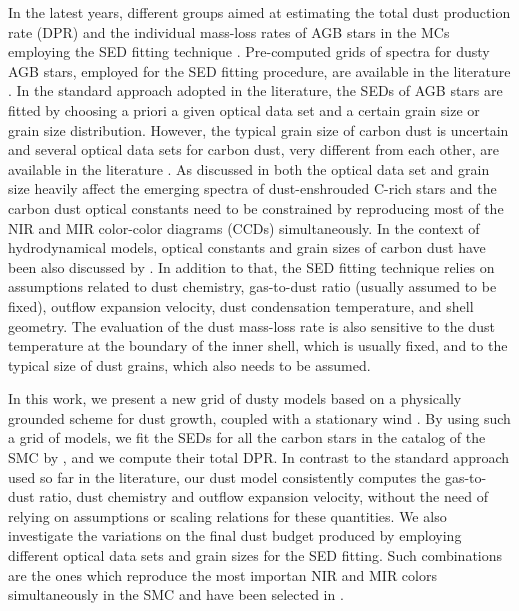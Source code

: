 \documentclass[useAMS,usenatbib]{mn2e/mn2e}
\begin{document}
In the latest years, different groups aimed at estimating the total dust production rate (DPR) and the individual mass-loss rates of AGB stars in the MCs employing the SED fitting technique \citep{vanLoon06_2,Groenewegen07, Groenewegen09, Srinivasan11, Gullieuszik12, Boyer12, Riebel12, Matsuura13, Srinivasan16,Goldman17}.
Pre-computed grids of spectra for dusty AGB stars, employed for the SED fitting procedure, are available in the literature \citep{Groenewegen06,Srinivasan11}.
In the standard approach adopted in the literature, the SEDs of AGB stars are fitted by choosing a priori a given optical data set and a certain grain size or grain size distribution. 
However, the typical grain size of carbon dust is uncertain and several optical data sets for carbon dust, very different from each other, are available in the literature \citep{Hanner88,Rouleau91,Zubko96,Jaeger98}. 
As discussed in \citet{Nanni16} both the optical data set and grain size heavily affect the emerging spectra of dust-enshrouded C-rich stars and the carbon dust optical constants need to be constrained by reproducing most of the NIR and MIR color-color diagrams (CCDs) simultaneously. In the context of hydrodynamical models, optical constants and grain sizes of carbon dust have been also discussed by \citet{Andersen99}.
In addition to that, the SED fitting technique relies on assumptions related to dust chemistry, gas-to-dust ratio (usually assumed to be fixed), outflow expansion velocity, dust condensation temperature, and shell geometry. The evaluation of the dust mass-loss rate is also sensitive to the dust temperature at the boundary of the inner shell, which is usually fixed, and to the typical size of dust grains, which also needs to be assumed. 

In this work, we present a new grid of dusty models based on a physically grounded scheme for dust growth, coupled with a stationary wind \citep{Nanni13, Nanni14}. 
By using such a grid of models, we fit the SEDs for all the carbon stars in the catalog of the SMC by \citet{Srinivasan16}, and we compute their total DPR.
In contrast to the standard approach used so far in the literature, our dust model consistently computes the gas-to-dust ratio, dust chemistry and outflow expansion velocity, without the need of relying on assumptions or scaling relations for these quantities. 
We also investigate the variations on the final dust budget produced by employing different optical data sets and grain sizes for the SED fitting. Such combinations are the ones which reproduce the most importan NIR and MIR colors simultaneously in the SMC and have been selected in \citet{Nanni16}.
\end{document}
